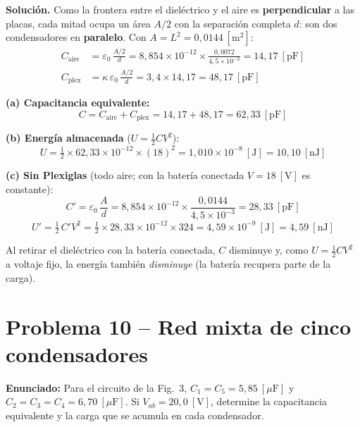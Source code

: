 \documentclass[12pt,letterpaper]{article}
\begin{document}
\medskip
\noindent\textbf{Soluci\'on.}
Como la frontera entre el diel\'ectrico y el aire es \textbf{perpendicular} a las placas, cada
mitad ocupa un \'area $A/2$ con la separaci\'on completa $d$: son dos condensadores en
\textbf{paralelo}. Con $A = L^2 = 0{,}0144\ [\text{m}^2]$:
\begin{align*}
    C_{\text{aire}} &= \varepsilon_0\,\frac{A/2}{d}
        = 8{,}854\times10^{-12}\times\frac{0{,}0072}{4{,}5\times10^{-3}} = 14{,}17\ [\text{pF}]\\[2pt]
    C_{\text{plex}} &= \kappa\,\varepsilon_0\,\frac{A/2}{d}
        = 3{,}4\times 14{,}17 = 48{,}17\ [\text{pF}]
\end{align*}

\noindent\textbf{(a) Capacitancia equivalente:}
\[
    \boxed{C = C_{\text{aire}} + C_{\text{plex}} = 14{,}17 + 48{,}17 = 62{,}33\ [\text{pF}]}
\]

\noindent\textbf{(b) Energ\'ia almacenada} ($U = \tfrac12 C V^2$):
\[
    \boxed{U = \tfrac12\times 62{,}33\times10^{-12}\times(18)^2 = 1{,}010\times10^{-8}\ [\text{J}] = 10{,}10\ [\text{nJ}]}
\]

\noindent\textbf{(c) Sin Plexiglas} (todo aire; con la bater\'ia conectada $V = 18\ [\text{V}]$ es
constante):
\[
    C' = \varepsilon_0\,\frac{A}{d} = 8{,}854\times10^{-12}\times\frac{0{,}0144}{4{,}5\times10^{-3}}
       = 28{,}33\ [\text{pF}]
\]
\[
    \boxed{U' = \tfrac12\,C' V^2 = \tfrac12\times 28{,}33\times10^{-12}\times 324 = 4{,}59\times10^{-9}\ [\text{J}] = 4{,}59\ [\text{nJ}]}
\]

\noindent Al retirar el diel\'ectrico con la bater\'ia conectada, $C$ disminuye y, como $U=\tfrac12 CV^2$
a voltaje fijo, la energ\'ia tambi\'en \emph{disminuye} (la bater\'ia recupera parte de la carga).

\newpage

\section*{Problema 10 -- Red mixta de cinco condensadores}

\noindent\textbf{Enunciado:}
Para el circuito de la Fig.\ 3, $C_1 = C_5 = 5{,}85\ [\mu\text{F}]$ y
$C_2 = C_3 = C_4 = 6{,}70\ [\mu\text{F}]$. Si $V_{ab} = 20{,}0\ [\text{V}]$, determine la capacitancia
equivalente y la carga que se acumula en cada condensador.
\end{document}
